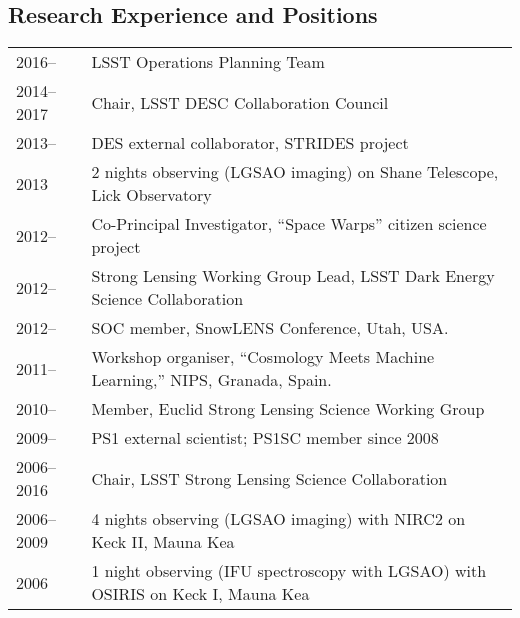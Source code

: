 \subsection*{Research Experience and Positions}

%

\noindent
\begin{tabular}{@{}p{2.5cm}p{15.5cm}}
2016--      & LSST Operations Planning Team \\
2014--2017  & Chair, LSST DESC Collaboration Council \\
2013--      & DES external collaborator, STRIDES project \\
2013        & 2 nights observing (LGSAO imaging) on Shane Telescope, Lick Observatory\\
2012--      & Co-Principal Investigator, ``Space Warps'' citizen science project \\
2012--      & Strong Lensing Working Group Lead, LSST Dark Energy Science Collaboration \\
2012--      & SOC member, SnowLENS Conference, Utah, USA. \\
2011--      & Workshop organiser, ``Cosmology Meets Machine Learning,'' NIPS, Granada, Spain. \\
2010--      & Member, Euclid Strong Lensing Science Working Group\\
2009--      & PS1 external scientist;  PS1SC member since 2008 \\
2006--2016  & Chair, LSST Strong Lensing Science Collaboration\\
2006--2009  & 4 nights observing (LGSAO imaging) with NIRC2 on Keck II, Mauna Kea\\
2006        & 1 night observing (IFU spectroscopy with LGSAO) with OSIRIS on Keck I, Mauna Kea\\

\end{tabular}

